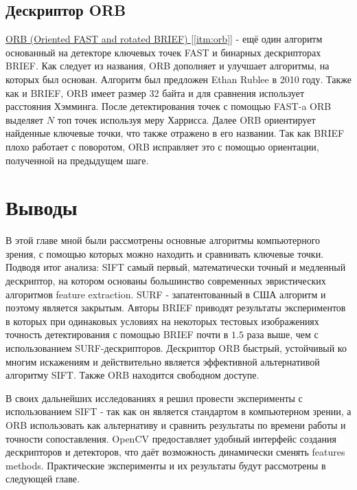 \subsection{Дескриптор ORB}

\hyperref[itm:orb]{ ORB (Oriented FAST and rotated BRIEF) [\ref{itm:orb}]} - ещё один алгоритм основанный на детекторе ключевых точек FAST и бинарных дескрипторах BRIEF. Как следует из названия, ORB дополняет и улучшает алгоритмы, на которых был основан. Алгоритм был предложен Ethan Rublee в 2010 году. Также как и BRIEF, ORB имеет размер 32 байта и для сравнения использует расстояния Хэмминга. После детектирования точек с помощью FAST-a ORB выделяет $N$ топ точек используя меру Харрисса. Далее ORB ориентирует найденные ключевые точки, что также отражено в его названии. Так как BRIEF плохо работает с поворотом, ORB исправляет это с помощью ориентации, полученной на предыдущем шаге.

\section{Выводы}

В этой главе мной были рассмотрены основные алгоритмы компьютерного зрения, с помощью которых можно находить и сравнивать ключевые точки. Подводя итог анализа: SIFT самый первый, математически точный и медленный дескриптор, на котором основаны большинство современных эвристических алгоритмов feature extraction. SURF - запатентованный в США алгоритм и поэтому является закрытым. Авторы BRIEF приводят результаты экспериментов в которых при одинаковых условиях на некоторых тестовых изображениях точность детектирования с помощью BRIEF почти в $1.5$ раза выше, чем с использованием SURF-дескрипторов. Дескриптор ORB быстрый, устойчивый ко многим искажениям и действительно является эффективной альтернативой алгоритму SIFT. Также ORB находится свободном доступе.

В своих дальнейших исследованиях я решил провести эксперименты с использованием SIFT - так как он является стандартом в компьютерном зрении, а ORB использовать как альтернативу и сравнить результаты по времени работы и точности сопоставления. OpenCV предоставляет удобный интерфейс создания дескрипторов и детекторов, что даёт возможность динамически сменять features methods. Практические эксперименты и их результаты будут рассмотрены в следующей главе.

\newpage